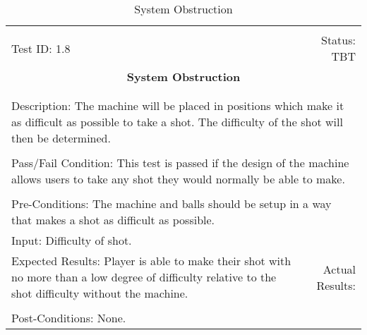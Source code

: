 \documentclass[titlepage]{article}
\begin{document}
\begin{center}%
\begin{table}[h!]
\begin{tabular}{|l r|}\hline&\\[-2mm]
	Test ID: 1.8	&Status: TBT\\[-3mm]
	\multicolumn{2}{|c|}{\textbf{\large{System Obstruction}}}\\&\\\hline&\\[-3mm]
	\multicolumn{2}{|p{\textwidth}|}{Description: The machine will be placed in positions which make it as difficult as possible to take a shot. The difficulty of the shot will then be determined.}\\[1mm]\hline&\\[-3mm]
	\multicolumn{2}{|p{\textwidth}|}{Pass/Fail Condition: This test is passed if the design of the machine allows users to take any shot they would normally be able to make.}\\[1mm]\hline&\\[-3mm]
	\multicolumn{2}{|p{\textwidth}|}{Pre-Conditions: The machine and balls should be setup in a way that makes a shot as difficult as possible.}\\[4mm]
	\multicolumn{2}{|p{\textwidth}|}{Input: Difficulty of shot.}\\[2mm]\hline
	\multicolumn{1}{|p{0.49\textwidth}}{Expected Results: Player is able to make their shot with no more than a low degree of difficulty relative to the shot difficulty without the machine.}	&\multicolumn{1}{|p{0.45\textwidth}|}{Actual Results:}\\\hline&\\[-3mm]
	\multicolumn{2}{|p{\textwidth}|}{Post-Conditions: None.}\\\hline
\end{tabular}
\caption{System Obstruction}
\end{table}
\end{center}
\newpage
\end{document}
